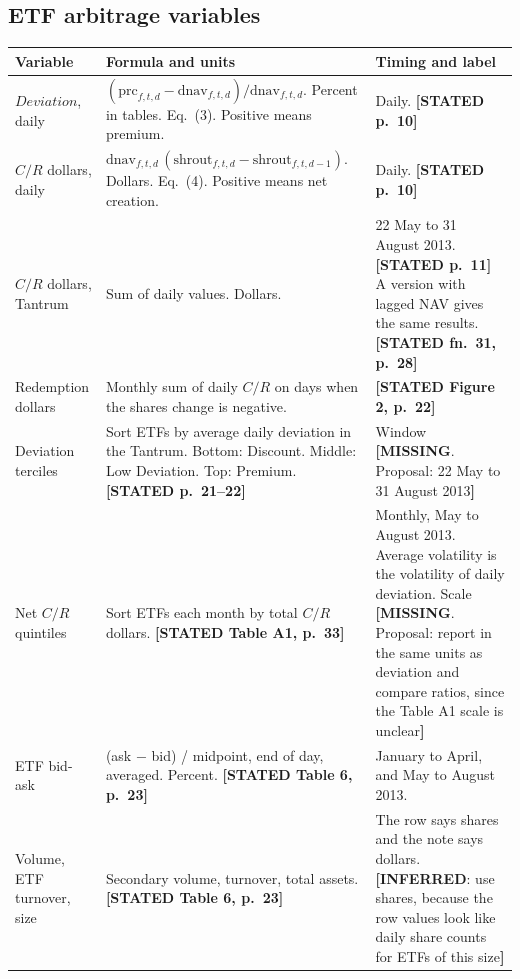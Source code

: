 \documentclass[10pt,a4paper]{article}
\newcommand{\ST}[1]{\textcolor{cst}{\textbf{[STATED #1]}}}
\newcommand{\IN}[1]{\textcolor{cin}{\textbf{[INFERRED}: #1\textbf{]}}}
\newcommand{\MI}[1]{\textcolor{cmi}{\textbf{[MISSING}. Proposal: #1\textbf{]}}}
\begin{document}
\subsection{ETF arbitrage variables}
\begin{longtable}{@{}P{2.7cm}P{7.2cm}P{7.1cm}@{}}
\toprule
Variable & Formula and units & Timing and label\\
\midrule\endhead
$\mathit{Deviation}$, daily & $(\text{prc}_{f,t,d}-\text{dnav}_{f,t,d})/\text{dnav}_{f,t,d}$. Percent in tables. Eq.~(3). Positive means premium. & Daily. \ST{p.~10}\\
$C/R$ dollars, daily & $\text{dnav}_{f,t,d}\,(\text{shrout}_{f,t,d}-\text{shrout}_{f,t,d-1})$. Dollars. Eq.~(4). Positive means net creation. & Daily. \ST{p.~10}\\
$C/R$ dollars, Tantrum & Sum of daily values. Dollars. & 22 May to 31 August 2013. \ST{p.~11} A version with lagged NAV gives the same results. \ST{fn.~31, p.~28}\\
Redemption dollars & Monthly sum of daily $C/R$ on days when the shares change is negative. & \ST{Figure 2, p.~22}\\
Deviation terciles & Sort ETFs by average daily deviation in the Tantrum. Bottom: Discount. Middle: Low Deviation. Top: Premium. \ST{p.~21--22} & Window \MI{22 May to 31 August 2013}\\
Net $C/R$ quintiles & Sort ETFs each month by total $C/R$ dollars. \ST{Table A1, p.~33} & Monthly, May to August 2013. Average volatility is the volatility of daily deviation. Scale \MI{report in the same units as deviation and compare ratios, since the Table A1 scale is unclear}\\
ETF bid-ask & (ask $-$ bid) / midpoint, end of day, averaged. Percent. \ST{Table 6, p.~23} & January to April, and May to August 2013.\\
Volume, ETF turnover, size & Secondary volume, turnover, total assets. \ST{Table 6, p.~23} & The row says shares and the note says dollars. \IN{use shares, because the row values look like daily share counts for ETFs of this size}\\
\bottomrule
\end{longtable}
\end{document}
